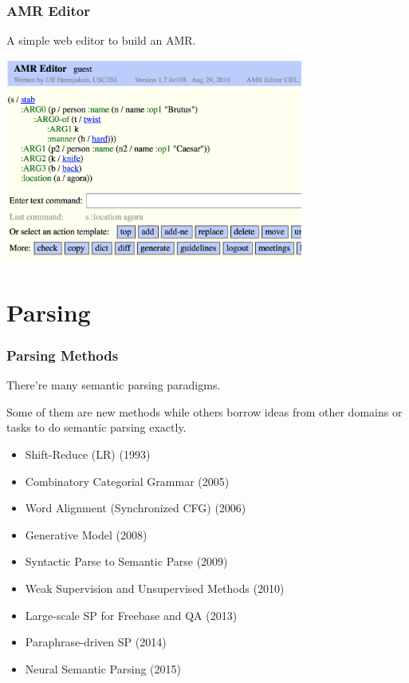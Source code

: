 \documentclass{beamer}
\begin{document}
\begin{frame}
    \frametitle{AMR Editor}

    A simple web editor to build an AMR.

    \begin{center}
        \includegraphics[height=6.7cm,width=9.8cm]{img/amr-editor.png}
    \end{center}
\end{frame}

\section{Parsing}

\begin{frame}
    \frametitle{Parsing Methods}

    There're many semantic parsing paradigms.

    Some of them are new methods while others borrow ideas from other domains or tasks to do semantic parsing exactly.

    \begin{itemize}
        \item Shift-Reduce (LR) (1993)
        \item Combinatory Categorial Grammar (2005)
        \item Word Alignment (Synchronized CFG) (2006)
        \item Generative Model (2008)
        \item Syntactic Parse to Semantic Parse (2009)
        \item Weak Supervision and Unsupervised Methods (2010)
        \item Large-scale SP for Freebase and QA (2013)
        \item Paraphrase-driven SP (2014)
        \item Neural Semantic Parsing (2015)
    \end{itemize}

\end{frame}
\end{document}

